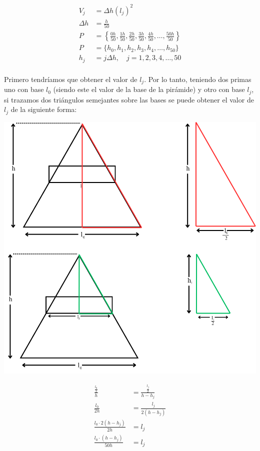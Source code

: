 \documentclass[12pt]{article}
\begin{document}
\begin{enumerate}
            \begin{align*}
                V_j &= \Delta h(l_j)^2 \\
                \Delta h &= \frac{h}{50}\\
                P &= \left\{ \frac{0h}{50}, \frac{1h}{50}, \frac{2h}{50}, \frac{3h}{50}, \frac{4h}{50}, \dots,\frac{50h}{50} \right\}\\
                P &= \{ h_0, h_1, h_2, h_3, h_4, \dots, h_{50} \}\\
                h_j &= j \Delta h, \quad j = 1, 2, 3, 4, \dots, 50\\
            \end{align*}
            
        Primero tendríamos que obtener el valor de $l_j$. Por lo tanto, teniendo dos primas uno con base $l_0$ (siendo este el valor de la base de la pirámide) y otro con base $l_j$, si trazamos dos triángulos semejantes sobre las bases se puede obtener el valor de $ l_j$ de la siguiente forma:
        
        
        \begin{minipage}[H]{0.45\textwidth}
            \raggedleft
            \includegraphics[width=\textwidth, center]{piramide2.png}
        \end{minipage}
        \hfill
        \begin{minipage}[H]{0.45\textwidth}
            \begin{align*}
                \frac{\frac{l_0}{2}}{h} &= \frac{\frac{l_j}{2}}{h - h_j}\\
                \frac{l_0}{2h} &= \frac{l_j}{2(h - h_j)}\\
                \frac{l_0 \cdot 2(h - h_j)}{2h} &= l_j\\
                \frac{l_0 \cdot (h - h_j)}{50h} &= l_j
            \end{align*}
        \end{minipage}
        

\end{enumerate}
\end{document}
